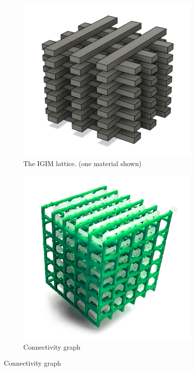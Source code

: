\begin{figure}
	\centering
	\begin{subfigure}[B]{.49\columnwidth}
		\includegraphics{sources/method/basic_lattice.jpg}
		\caption{The IGIM lattice. (one material shown)}
		\label{fig:basic_structure_single_mat}
	\end{subfigure}
	\begin{subfigure}[B]{.49\columnwidth}
		\includegraphics{sources/method/connectivity_lattice.jpg}
		\caption{Connectivity graph}
		\label{fig:connectivity_graph}
	\end{subfigure}
	\label{fig:basic_structure}
\end{figure}


